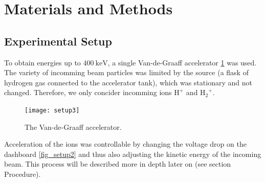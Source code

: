 \section{Materials and Methods}
\subsection{Experimental Setup}
To obtain energies up to $\SI{400}{\kilo\electronvolt}$, a single
Van-de-Graaff accelerator \cref{fig_setup3} was used. The variety of incomming
beam particles was limited by the source (a flask of hydrogen gas connected to
the accelerator tank), which was stationary and not changed. Therefore, we only
concider incomming ions $\mathrm{H^+}$ and $\mathrm{{H_2}^{+}}$. 
%
\begin{figure}[t]
    \centering
    \texttt{[image: setup3]}
    \caption{The Van-de-Graaff accelerator.}
    \label{fig_setup3}
\end{figure}
%
Acceleration of the ions was controllable by changing the voltage drop on the
dashboard \cref{fig_setup2} and thus also adjusting the kinetic energy of the
incoming beam. This process will be described more in depth later on (see section Procedure).

